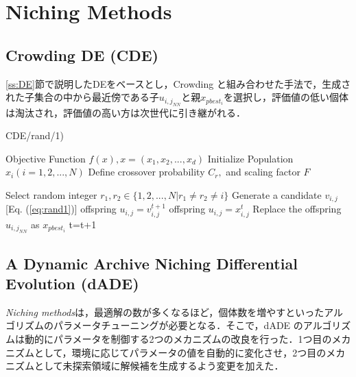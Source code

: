\documentclass[a4j,11pt]{jarticle}
\begin{document}

\newpage
\section{Niching Methods}
\label{sec:nm}


\subsection{Crowding DE (CDE)}
\label{ss:cde}
\ref{ss:DE}節で説明したDEをベースとし，Crowding \cite{Crowding} と組み合わせた手法で，生成された子集合の中から最近傍である子$u_{{i,j}_{NN}}$と親$x_{pbest_i}$を選択し，評価値の低い個体は淘汰され，評価値の高い方は次世代に引き継がれる．

\begin{algorithm}[H]
\caption{CDE/rand/1)}
\label{code:cde}
\begin{algorithmic}[3]
\REQUIRE Objective Function $f(x), x=(x_1,x_2,...,x_d)$
\STATE Initialize Population $x_i (i=1,2,...,N)$ 
\STATE Define crossover probability $C_r,$ and scaling factor $F$

\STATE Select random integer $r_1, r_2 \in \{ 1,2,..., N| r_1 \neq r_2 \neq i\}$
\STATE Generate a candidate $v_{i,j}$  [Eq. (\ref{eq:rand1})]
\STATE offspring $u_{i,j} = v_{i,j}^{t+1}$
\STATE offspring $u_{i,j} = x_{i,j}^t$
\ENDIF
\ENDFOR
{}
\STATE Replace the offspring $u_{{i,j}_{NN}}$ as $x_{pbest_i}$
\ENDIF
\ENDFOR
\STATE t=t+1
\ENDWHILE
\end{algorithmic}
\end{algorithm}

\subsection{A Dynamic Archive Niching Differential Evolution (dADE)}
\label{ss:dADE}
{\it Niching methods}は，最適解の数が多くなるほど，個体数を増やすといったアルゴリズムのパラメータチューニングが必要となる．そこで，dADE \cite{dADE} のアルゴリズムは動的にパラメータを制御する2つのメカニズムの改良を行った．1つ目のメカニズムとして，環境に応じてパラメータの値を自動的に変化させ，2つ目のメカニズムとして未探索領域に解候補を生成するよう変更を加えた．
\end{document}
